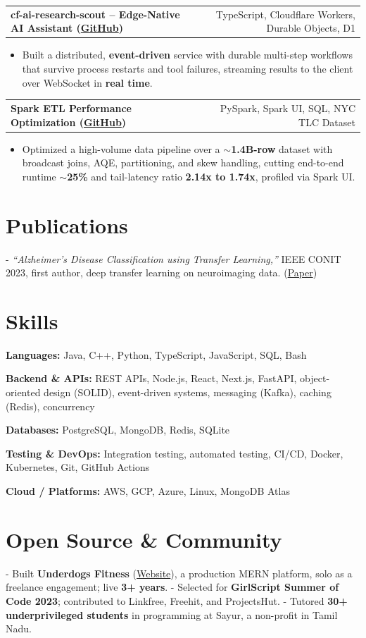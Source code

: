\documentclass[letterpaper,11pt]{article}
\makeatletter
\newcommand{\projItem}[2]{%
  \vspace{2pt}
  \begin{tabular*}{\textwidth}{@{}l@{\extracolsep{\fill}}r@{}}
    \textbf{#1} & #2 \\
  \end{tabular*}\par\vspace{-3pt}
}
\newcommand{\skillLine}[2]{\textbf{#1:} #2\par\vspace{1.5pt}}
\newcommand{\inlineBlock}[1]{{\setlength{\leftskip}{0.18in}\small #1\par}}
\makeatother
\begin{document}
\projItem{cf-ai-research-scout -- Edge-Native AI Assistant {\normalfont\small(\href{https://github.com/Deva-1903/cf_ai_research_scout}{GitHub})}}{TypeScript, Cloudflare Workers, Durable Objects, D1}
\begin{itemize}
  \item Built a distributed, \textbf{event-driven} service with durable multi-step workflows that survive process restarts and tool failures, streaming results to the client over WebSocket in \textbf{real time}.
\end{itemize}

\projItem{Spark ETL Performance Optimization {\normalfont\small(\href{https://github.com/Deva-1903/Spark-ETL-Optimization}{GitHub})}}{PySpark, Spark UI, SQL, NYC TLC Dataset}
\begin{itemize}
  \item Optimized a high-volume data pipeline over a \textbf{$\sim$1.4B-row} dataset with broadcast joins, AQE, partitioning, and skew handling, cutting end-to-end runtime \textbf{$\sim$25\%} and tail-latency ratio \textbf{2.14x to 1.74x}, profiled via Spark UI.
\end{itemize}

\section{Publications}
\vspace{2pt}
\inlineBlock{- \textit{``Alzheimer's Disease Classification using Transfer Learning,''} IEEE CONIT 2023, first author, deep transfer learning on neuroimaging data. {\normalfont\small(\href{https://ieeexplore.ieee.org/document/10205760}{Paper})}}

\section{Skills}
\skillLine{Languages}{Java, C++, Python, TypeScript, JavaScript, SQL, Bash}
\skillLine{Backend \& APIs}{REST APIs, Node.js, React, Next.js, FastAPI, object-oriented design (SOLID), event-driven systems, messaging (Kafka), caching (Redis), concurrency}
\skillLine{Databases}{PostgreSQL, MongoDB, Redis, SQLite}
\skillLine{Testing \& DevOps}{Integration testing, automated testing, CI/CD, Docker, Kubernetes, Git, GitHub Actions}
\skillLine{Cloud / Platforms}{AWS, GCP, Azure, Linux, MongoDB Atlas}

\section{Open Source \& Community}
\inlineBlock{- Built \textbf{Underdogs Fitness} (\href{https://www.underdogsfitness.in/}{Website}), a production MERN platform, solo as a freelance engagement; live \textbf{3+ years}. - Selected for \textbf{GirlScript Summer of Code 2023}; contributed to Linkfree, Freehit, and ProjectsHut. - Tutored \textbf{30+ underprivileged students} in programming at Sayur, a non-profit in Tamil Nadu.}
\end{document}
